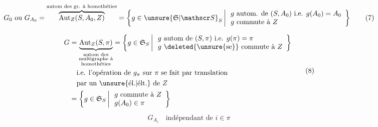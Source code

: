 

\[
G_0\ \text{ou}\ G_{A_0}=\overbrace{\operatorname{Aut}_Z(S,A_0,Z)}^{\text{autom des gr. à homothéties}}=\left\{g\in\unsure{\mathfrak S|\mathscr S}_S\,\middle|\,
\begin{array}{l}g\text{ autom. de }(S,A_0)\ \text{i.e. }g(A_0)=A_0\\g\text{ commute à }Z\end{array}\right\}\tag*{(7)}
\]


\[
\begin{aligned}
G&=\underbrace{\operatorname{Aut}_Z(S,\pi)}_{\substack{\text{autom des}\\\text{multigraphe à}\\\text{homothéties}}}
=\left\{g\in\mathfrak S_S\,\middle|\,\begin{array}{l}g\text{ autom de }(S,\pi)\ \text{i.e. }g(\pi)=\pi\\g\ \deleted{\unsure{\mathrm{se}}}\text{ commute à }Z\end{array}\right\}\\
&\hspace{1em}\text{i.e. l'opération de $g_\pi$ sur $\pi$ se fait par translation}\\
&\hspace{1em}\text{par un \unsure{él.|élt.} de $Z$}\\
&=\left\{g\in\mathfrak S_S\,\middle|\,\begin{array}{l}g\text{ commute à }Z\\g(A_0)\in\pi\end{array}\right\}
\end{aligned}\tag*{(8)}
\]

\[ G_{A_i}\quad\text{indépendant de } i\in\pi \tag*{(9)} \]

